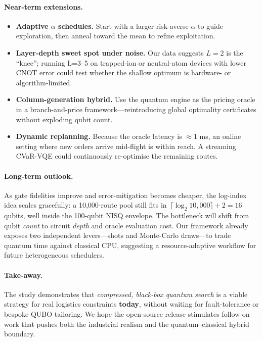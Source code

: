\paragraph{Near-term extensions.}
\begin{itemize}[nosep,leftmargin=*]
\item \textbf{Adaptive $\alpha$ schedules.}  Start with a larger
      risk-averse $\alpha$ to guide exploration, then anneal toward the
      mean to refine exploitation.
\item \textbf{Layer-depth sweet spot under noise.}  Our data
      suggests $L\!=\!2$ is the “knee”; running L=3–5 on trapped-ion or
      neutral-atom devices with lower CNOT error could test whether the
      shallow optimum is hardware- or algorithm-limited.
\item \textbf{Column-generation hybrid.}  Use the quantum engine as the
      pricing oracle in a branch-and-price framework—reintroducing global
      optimality certificates without exploding qubit count.
\item \textbf{Dynamic replanning.}  Because the oracle latency is
      $\approx1$ ms, an online setting where new orders arrive mid-flight
      is within reach.  A streaming CVaR-VQE could continuously
      re-optimise the remaining routes.
\end{itemize}

\paragraph{Long-term outlook.}
As gate fidelities improve and error-mitigation becomes cheaper, the
log-index idea scales gracefully:
a 10{,}000-route pool still fits in $\,\lceil\log_2 10{,}000\rceil+2=16$
qubits, well inside the 100-qubit NISQ envelope.
The bottleneck will shift from qubit \emph{count} to circuit \emph{depth}
and oracle evaluation cost.
Our framework already exposes two independent levers—shots and Monte-Carlo
draws—to trade quantum time against classical CPU, suggesting a
resource-adaptive workflow for future heterogeneous schedulers.

\paragraph{Take-away.}
The study demonstrates that \emph{compressed, black-box quantum search}
is a viable strategy for real logistics constraints \textbf{today},
without waiting for fault-tolerance or bespoke QUBO tailoring.
We hope the open-source release stimulates follow-on work that pushes
both the industrial realism and the quantum–classical hybrid boundary.


